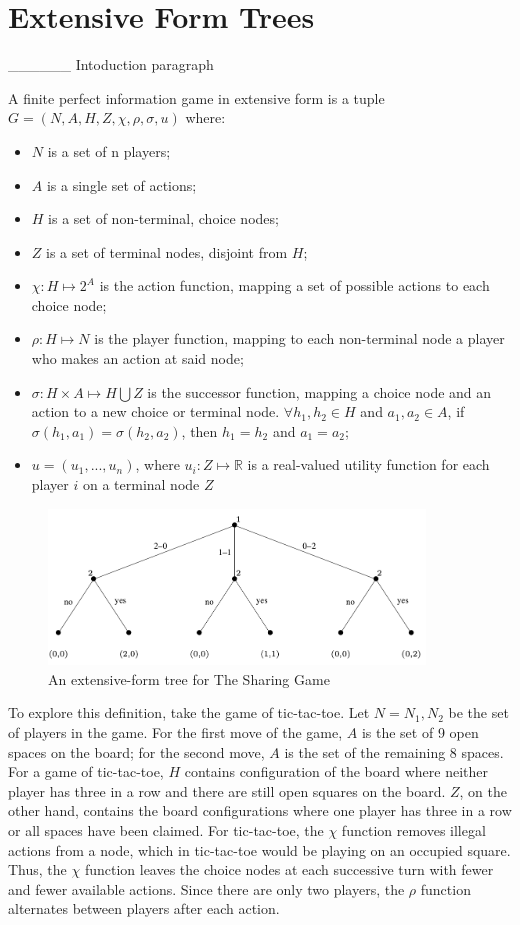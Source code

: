 \section{Extensive Form Trees}
\_\_\_\_\_\_ Intoduction paragraph
\begin{define}
  A finite perfect information game in extensive form is a tuple $G = (N, A, H, Z, \chi, \rho, \sigma, u)$ where:
  \begin{itemize}
  \item $N$ is a set of n players;
  \item $A$ is a single set of actions;
  \item $H$ is a set of non-terminal, choice nodes;
  \item $Z$ is a set of terminal nodes, disjoint from $H$;
  \item $\chi: H\mapsto 2^A$ is the action function, mapping a set of possible actions to each choice node;
  \item $\rho: H\mapsto N$ is the player function, mapping to each non-terminal node a player who makes an action at said node;
  \item $\sigma: H\times A\mapsto H\bigcup Z$ is the successor function, mapping a choice node and an action to a new choice or terminal node. $\forall h_1, h_2\in H$ and $a_1, a_2\in A$, if $\sigma(h_1, a_1)=\sigma(h_2, a_2)$, then $h_1=h_2$ and $a_1=a_2$;
  \item $u=(u_1,...,u_n)$, where $u_i:Z\mapsto \mathbb{R}$ is a real-valued utility function for each player $i$ on a terminal node $Z$
  \end{itemize}
\end{define}

\begin{figure}[h]
  \centering
  \includegraphics[width=10cm]{figures/ExampleTree.png}
  \caption{An extensive-form tree for The Sharing Game}
  \label{fig:sharingTree}
\end{figure}

To explore this definition, take the game of tic-tac-toe. Let $N={N_1, N_2}$ be the set of players in the game. For the first move of the game, $A$ is the set of 9 open spaces on the board; for the second move, $A$ is the set of the remaining 8 spaces. For a game of tic-tac-toe, $H$ contains configuration of the board where neither player has three in a row and there are still open squares on the board. $Z$, on the other hand, contains the board configurations where one player has three in a row or all spaces have been claimed. For tic-tac-toe, the $\chi$ function removes illegal actions from a node, which in tic-tac-toe would be playing on an occupied square. Thus, the $\chi$ function leaves the choice nodes at each successive turn with fewer and fewer available actions. Since there are only two players, the $\rho$ function alternates between players after each action.